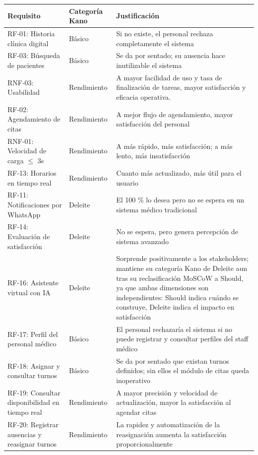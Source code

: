 \documentclass[11pt,a4paper]{article}
\begin{document}
	\begin{longtable}{p{} p{} p{}}
		
		\toprule
		\textbf{Requisito} &
		\textbf{Categoría Kano} &
		\textbf{Justificación} \\
		\midrule
		\endhead
		
		\bottomrule
		\endlastfoot
		RF-01: Historia clínica digital & Básico & Si no existe, el personal rechaza completamente el sistema \\
		RF-03: Búsqueda de pacientes & Básico & Se da por sentado; su ausencia hace inutilizable el sistema \\
		RNF-03: Usabilidad & Rendimiento & A mayor facilidad de uso y tasa de finalización de tareas, mayor satisfacción y eficacia operativa. \\
		RF-02: Agendamiento de citas & Rendimiento & A mejor flujo de agendamiento, mayor satisfacción del personal \\
		RNF-01: Velocidad de carga \(\leq\) 3s & Rendimiento & A más rápido, más satisfacción; a más lento, más insatisfacción \\
		RF-13: Horarios en tiempo real & Rendimiento & Cuanto más actualizado, más útil para el usuario \\
		RF-11: Notificaciones por WhatsApp & Deleite & El 100 \% lo desea pero no se espera en un sistema médico tradicional \\
		RF-14: Evaluación de satisfacción & Deleite & No se espera, pero genera percepción de sistema avanzado \\
		RF-16: Asistente virtual con IA & Deleite & Sorprende positivamente a los stakeholders; mantiene su categoría Kano de Deleite aun tras su reclasificación MoSCoW a Should, ya que ambas dimensiones son independientes: Should indica cuándo se construye, Deleite indica el impacto en satisfacción \\
		RF-17: Perfil del personal médico & Básico & El personal rechazaría el sistema si no puede registrar y consultar perfiles del staff médico \\
		RF-18: Asignar y consultar turnos & Básico & Se da por sentado que existan turnos definidos; sin ellos el módulo de citas queda inoperativo \\
		RF-19: Consultar disponibilidad en tiempo real & Rendimiento & A mayor precisión y velocidad de actualización, mayor la satisfacción al agendar citas \\
		RF-20: Registrar ausencias y reasignar turnos & Rendimiento & La rapidez y automatización de la reasignación aumenta la satisfacción proporcionalmente \\

\end{longtable}
\end{document}
